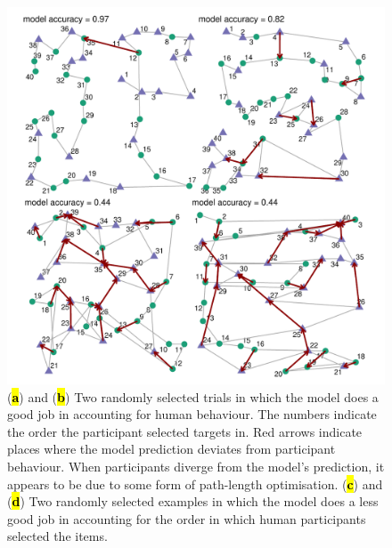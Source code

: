 \documentclass[vision,article,accept,pdftex,moreauthors]{Definitions/mdpi}
\begin{document}
\begin{figure}[H]
\includegraphics[width=12 cm]{Figures/qjep_ex_paths.pdf}
\caption{(\textbf{\hl{a}}) and (\textbf{\hl{b}}) Two randomly selected trials in which the model does a good job in accounting for human behaviour. The numbers indicate the order the participant selected targets in. Red arrows indicate places where the model prediction deviates from participant behaviour. When participants diverge from the model's prediction, it appears to be due to some form of path-length optimisation. (\textbf{\hl{c}}) and (\textbf{\hl{d}}) Two randomly selected examples in which the model does a less good job in accounting for the order in which human participants selected the items.}%

\label{fig:qjep_paths}
\end{figure} 
\end{document}
